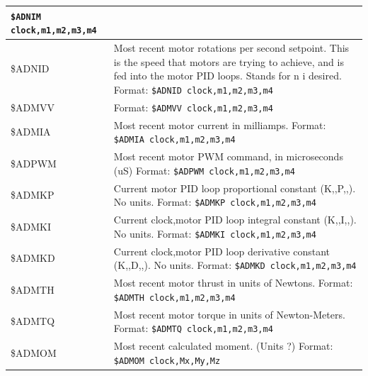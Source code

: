 \documentclass{article}
\numberwithin{equation}{section} %
\begin{document}
\begin{longtable}{p{2cm}p{9cm}}
\texttt{\$ADNIM clock,m1,m2,m3,m4} \\
\hline
\$ADNID &
Most recent motor rotations per second setpoint. This is the speed that motors are trying to achieve, and is fed into the motor PID loops. Stands for n i desired.
\newline
Format:\newline
\texttt{\$ADNID clock,m1,m2,m3,m4} \\
\hline
\$ADMVV &
\newline
Format:\newline
\texttt{\$ADMVV clock,m1,m2,m3,m4} \\
\hline
\$ADMIA &
Most recent motor current in milliamps.
\newline
Format:\newline
\texttt{\$ADMIA clock,m1,m2,m3,m4} \\
\hline
\$ADPWM &
Most recent motor PWM command, in microseconds (uS)
\newline
Format:\newline
\texttt{\$ADPWM clock,m1,m2,m3,m4} \\
\hline
\$ADMKP &
Current motor PID loop proportional constant (K,,P,,). No units.
\newline
Format:\newline
\texttt{\$ADMKP clock,m1,m2,m3,m4} \\
\hline
\$ADMKI &
Current clock,motor PID loop integral constant (K,,I,,). No units.
\newline
Format:\newline
\texttt{\$ADMKI clock,m1,m2,m3,m4} \\
\hline
\$ADMKD &
Current clock,motor PID loop derivative constant (K,,D,,). No units.
\newline
Format:\newline
\texttt{\$ADMKD clock,m1,m2,m3,m4} \\
\hline
\$ADMTH &
Most recent motor thrust in units of Newtons.
\newline
Format:\newline
\texttt{\$ADMTH clock,m1,m2,m3,m4} \\
\hline
\$ADMTQ &
Most recent motor torque in units of Newton-Meters.
\newline
Format:\newline
\texttt{\$ADMTQ clock,m1,m2,m3,m4} \\
\hline
\$ADMOM &
Most recent calculated moment. (Units ?)
\newline
Format:\newline
\texttt{\$ADMOM clock,Mx,My,Mz} \\

\end{longtable}
\end{document}
